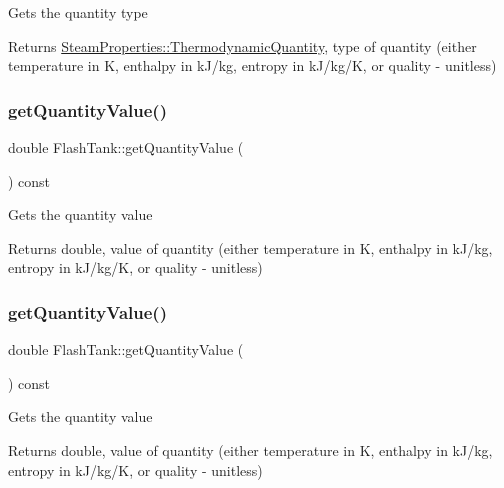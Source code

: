 Gets the quantity type \begin{DoxyReturn}{Returns}
\hyperlink{class_steam_properties_ae0294bedf7d178c2d8fb6aed0f62fbff}{Steam\+Properties\+::\+Thermodynamic\+Quantity}, type of quantity (either temperature in K, enthalpy in k\+J/kg, entropy in k\+J/kg/K, or quality -\/ unitless) 
\end{DoxyReturn}
\mbox{\label{class_flash_tank_ab2145598969881df58736a1b65326d17}} 
\subsubsection{\texorpdfstring{get\+Quantity\+Value()}{getQuantityValue()}\hspace{0.1cm}{\footnotesize\ttfamily [1/3]}}
{\footnotesize\ttfamily double Flash\+Tank\+::get\+Quantity\+Value (\begin{DoxyParamCaption}{ }\end{DoxyParamCaption}) const}

Gets the quantity value \begin{DoxyReturn}{Returns}
double, value of quantity (either temperature in K, enthalpy in k\+J/kg, entropy in k\+J/kg/K, or quality -\/ unitless) 
\end{DoxyReturn}
\mbox{\label{class_flash_tank_ab2145598969881df58736a1b65326d17}} 
\subsubsection{\texorpdfstring{get\+Quantity\+Value()}{getQuantityValue()}\hspace{0.1cm}{\footnotesize\ttfamily [2/3]}}
{\footnotesize\ttfamily double Flash\+Tank\+::get\+Quantity\+Value (\begin{DoxyParamCaption}{ }\end{DoxyParamCaption}) const}

Gets the quantity value \begin{DoxyReturn}{Returns}
double, value of quantity (either temperature in K, enthalpy in k\+J/kg, entropy in k\+J/kg/K, or quality -\/ unitless) 
\end{DoxyReturn}


